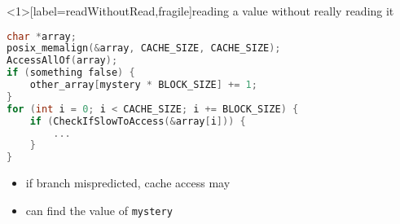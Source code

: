 \begin{frame}<1>[label=readWithoutRead,fragile]{reading a value without really reading it}
\begin{lstlisting}[language=C,style=smaller]
char *array;
posix_memalign(&array, CACHE_SIZE, CACHE_SIZE);
AccessAllOf(array);
if (something false) {
    other_array[mystery * BLOCK_SIZE] += 1;
}
for (int i = 0; i < CACHE_SIZE; i += BLOCK_SIZE) {
    if (CheckIfSlowToAccess(&array[i])) {
        ...
    }
}
\end{lstlisting}
\begin{itemize}
\item if branch mispredicted, cache access may 
\item can find the value of \texttt{mystery}
\end{itemize}
\end{frame}
